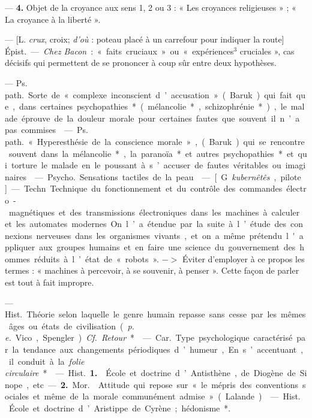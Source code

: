 \begin{itemize}[leftmargin=1cm, label=, itemsep=11pt]
— {\bf 4.}  Objet de la croyance aux
sens 1, 2 ou 3 : « Les croyances religieuses » ; « La croyance à la liberté ».

 — [L. {\it crux}, croix; {\it d’où} : poteau
placé à un carrefour pour indiquer
la route] \si{Épist.} — {\it Chez Bacon} :
« faits cruciaux » ou « expériences$^3$
cruciales », cas décisifs qui permettent de se prononcer à coup sûr entre
deux hypothèses.

 — \si{Ps. path.} Sorte de « complexe inconscient
d’accusation » (Baruk) qui fait que,
dans certaines psychopathies* (mélancolie*, schizophrénie*), le malade
éprouve de la douleur morale pour
certaines fautes que souvent il n’a
pas commises.

 — \si{Ps. path.} « Hyperesthésie de la
conscience morale », (Baruk) qui se rencontre souvent dans la mélancolie*, la
paranoïa* et autres psychopathies* et qui torture le malade en le poussant à
s’accuser de fautes véritables ou imaginaires.

 — \si{Psycho.} Sensations tactiles de la peau.

 — [G. {\it kubernêtês}, pilote] —
Techn. Technique du fonctionnement et du contrôle des commandes
électro-magnétiques et des transmissions électroniques dans les machines à calculer et les automates
modernes. On l’a étendue par la suite
à l’étude des connexions nerveuses
dans les organismes vivants, et on a
même prétendu l'appliquer aux
groupes humains et en faire une
science du gouvernement des hommes réduits à l’état de « robots ».
$->$ Éviter d'employer à ce propos
les termes : « machines à percevoir,
à se souvenir, à penser ». Cette façon
de parler est tout à fait impropre.

 —  \si{Hist.} Théorie selon laquelle
le genre humain repasse sans cesse par les mêmes âges ou états de
civilisation ({\it p. e.} Vico, Spengler). {\it Cf.} {\it Retour}*.

 — \si{Car.} Type psychologique caractérisé par la tendance
aux changements périodiques d’humeur, En s’accentuant, il conduit à
la {\it folie circulaire}*.

 — \si{Hist.} {\bf 1.}  École et doctrine d’Antisthène, de Diogène de
Sinope, etc.

— {\bf 2.} \si{Mor.}  Attitude qui repose
sur « le mépris des conventions sociales et même de la morale communément admise » (Lalande).

 — \si{Hist.}  École et doctrine d’Aristippe de Cyrène; hédonisme*.

	\end{itemize}

